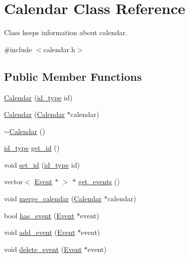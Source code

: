 \hypertarget{classCalendar}{
\section{Calendar Class Reference}
\label{dd/dac/classCalendar}
}


Class keeps information about calendar.  




{\ttfamily \#include $<$calendar.h$>$}

\subsection*{Public Member Functions}
\begin{DoxyCompactItemize}
\item 
\hyperlink{classCalendar_ae8e2987543087a4c91179e875388504e}{Calendar} (\hyperlink{types_8h_a0b60c08a3ab1435cccc5643d32d8ccee}{id\_\-type} id)
\item 
\hyperlink{classCalendar_a6a6373f8f939a50ca5b6f28613420d07}{Calendar} (\hyperlink{classCalendar}{Calendar} $\ast$calendar)
\item 
\hyperlink{classCalendar_a23aa939f694874a8f98ec54326d80741}{$\sim$Calendar} ()
\item 
\hyperlink{types_8h_a0b60c08a3ab1435cccc5643d32d8ccee}{id\_\-type} \hyperlink{classCalendar_ab9f9a418d5122e8f5915fd817b8422b1}{get\_\-id} ()
\item 
void \hyperlink{classCalendar_a1d5d2228fa04cc9ed48756c2569a69ae}{set\_\-id} (\hyperlink{types_8h_a0b60c08a3ab1435cccc5643d32d8ccee}{id\_\-type} id)
\item 
vector$<$ \hyperlink{classEvent}{Event} $\ast$ $>$ $\ast$ \hyperlink{classCalendar_aa1e9611c947c9b37975437b188066bf9}{get\_\-events} ()
\item 
void \hyperlink{classCalendar_a9ed5161b06c2a2acc8e5febbeeeb39b0}{merge\_\-calendar} (\hyperlink{classCalendar}{Calendar} $\ast$calendar)
\item 
bool \hyperlink{classCalendar_a46578e7e3f65bd5d523a108ad00965dd}{has\_\-event} (\hyperlink{classEvent}{Event} $\ast$event)
\item 
void \hyperlink{classCalendar_ad099edd0e82ca0a2ffb18702d029fffa}{add\_\-event} (\hyperlink{classEvent}{Event} $\ast$event)
\item 
void \hyperlink{classCalendar_a305abce38aacb905a0277f573f6b486c}{delete\_\-event} (\hyperlink{classEvent}{Event} $\ast$event)
\end{DoxyCompactItemize}


